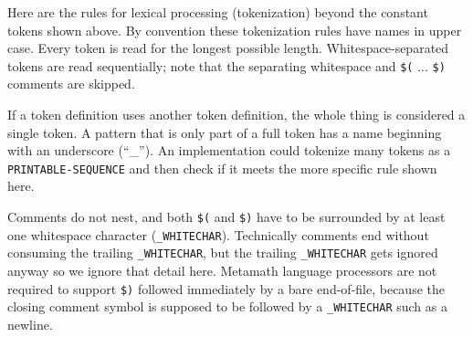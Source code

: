 Here are the rules for lexical processing (tokenization) beyond
the constant tokens shown above.
By convention these tokenization rules have names in upper case.
Every token is read for the longest possible length.
Whitespace-separated tokens are read sequentially;
note that the separating whitespace and \texttt{\$(} ... \texttt{\$)}
comments are skipped.

If a token definition uses another token definition, the whole thing
is considered a single token.
A pattern that is only part of a full token has a name beginning
with an underscore (``\_'').
An implementation could tokenize many tokens as a
\texttt{PRINTABLE-SEQUENCE}
and then check if it meets the more specific rule shown here.

Comments do not nest, and both \texttt{\$(} and \texttt{\$)}
have to be surrounded
by at least one whitespace character (\texttt{\_WHITECHAR}).
Technically comments end without consuming the trailing
\texttt{\_WHITECHAR}, but the trailing
\texttt{\_WHITECHAR} gets ignored anyway so we ignore that detail here.
Metamath language processors
are not required to support \texttt{\$)} followed
immediately by a bare end-of-file, because the closing
comment symbol is supposed to be followed by a
\texttt{\_WHITECHAR} such as a newline.

